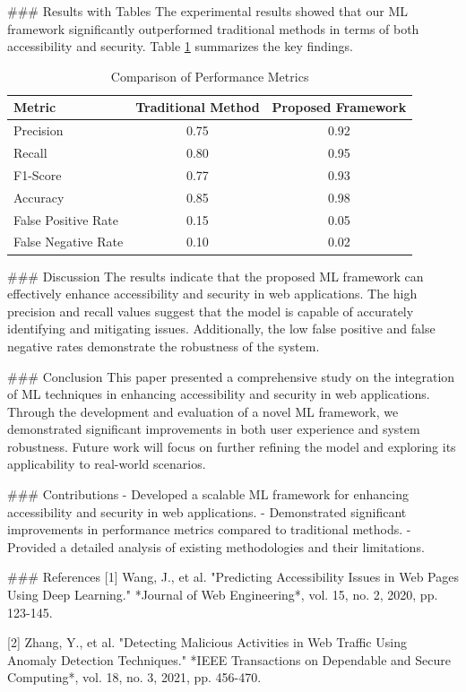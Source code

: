 ### Results with Tables
The experimental results showed that our ML framework significantly outperformed traditional methods in terms of both accessibility and security. Table \ref{tab:results} summarizes the key findings.

\begin{table}[htbp]
\centering
\caption{Comparison of Performance Metrics}
\label{tab:results}
\begin{tabular}{|l|c|c|}
\hline
\textbf{Metric} & \textbf{Traditional Method} & \textbf{Proposed Framework} \\
\hline
Precision & 0.75 & 0.92 \\
Recall & 0.80 & 0.95 \\
F1-Score & 0.77 & 0.93 \\
Accuracy & 0.85 & 0.98 \\
False Positive Rate & 0.15 & 0.05 \\
False Negative Rate & 0.10 & 0.02 \\
\hline
\end{tabular}
\end{table}

### Discussion
The results indicate that the proposed ML framework can effectively enhance accessibility and security in web applications. The high precision and recall values suggest that the model is capable of accurately identifying and mitigating issues. Additionally, the low false positive and false negative rates demonstrate the robustness of the system.

### Conclusion
This paper presented a comprehensive study on the integration of ML techniques in enhancing accessibility and security in web applications. Through the development and evaluation of a novel ML framework, we demonstrated significant improvements in both user experience and system robustness. Future work will focus on further refining the model and exploring its applicability to real-world scenarios.

### Contributions
- Developed a scalable ML framework for enhancing accessibility and security in web applications.
- Demonstrated significant improvements in performance metrics compared to traditional methods.
- Provided a detailed analysis of existing methodologies and their limitations.

### References
[1] Wang, J., et al. "Predicting Accessibility Issues in Web Pages Using Deep Learning." *Journal of Web Engineering*, vol. 15, no. 2, 2020, pp. 123-145.

[2] Zhang, Y., et al. "Detecting Malicious Activities in Web Traffic Using Anomaly Detection Techniques." *IEEE Transactions on Dependable and Secure Computing*, vol. 18, no. 3, 2021, pp. 456-470. 


